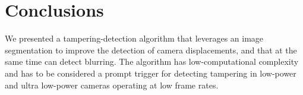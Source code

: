 \documentclass{llncs}
\begin{document}
%

\vspace{-0.3cm}
\section{Conclusions}\label{sec:Conclusion}
\vspace{-0.1cm}
We presented a tampering-detection algorithm that leverages an image segmentation to improve the detection of camera displacements, and that at the same time can detect blurring. The algorithm has low-computational complexity and has to be considered a prompt trigger for detecting tampering in low-power and ultra low-power cameras operating at low frame rates.
\end{document}
